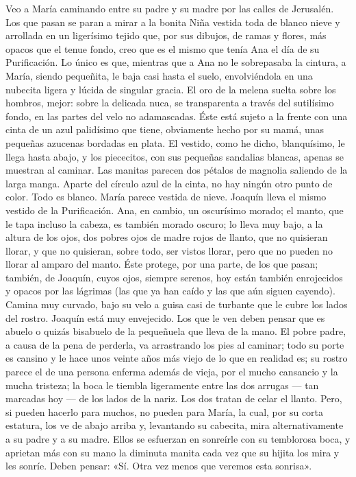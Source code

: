 \documentclass[12pt]{book} %
\begin{document}
Veo a María caminando entre su padre y su madre por las calles de Jerusalén. 
Los que pasan se paran a mirar a la bonita Niña vestida toda de blanco nieve y arrollada en un ligerísimo tejido que, por 
sus dibujos, de ramas y flores, más opacos que el tenue fondo, creo que es el mismo que tenía Ana el día de su Purificación. Lo único es que, mientras que a Ana no le sobrepasaba la cintura, a María, siendo pequeñita, le baja casi hasta el suelo, envolviéndola en una nubecita ligera y lúcida de singular gracia. 
El oro de la melena suelta sobre los hombros, mejor: sobre la delicada nuca, se transparenta a través del sutilísimo fondo, en las partes del velo no adamascadas. Éste está sujeto a la frente con una cinta de un azul palidísimo que tiene, obviamente hecho por su mamá, unas pequeñas azucenas bordadas en plata. 
El vestido, como he dicho, blanquísimo, le llega hasta abajo, y los piececitos, con sus pequeñas sandalias blancas, 
apenas se muestran al caminar. Las manitas parecen dos pétalos de magnolia saliendo de la larga manga. Aparte del círculo azul de la cinta, no hay ningún otro punto de color. Todo es blanco. María parece vestida de nieve. 
Joaquín lleva el mismo vestido de la Purificación. Ana, en cambio, un oscurísimo morado; el manto, que le tapa incluso la cabeza, es también morado oscuro; lo lleva muy bajo, a la altura de los ojos, dos pobres ojos de madre rojos de llanto, que no quisieran llorar, y que no quisieran, sobre todo, ser vistos llorar, pero que no pueden no llorar al amparo del manto. Éste protege, por una parte, de los que pasan; también, de Joaquín, cuyos ojos, siempre serenos, hoy están también enrojecidos y opacos por las lágrimas (las que ya han caído y las que aún siguen cayendo). Camina muy curvado, bajo su velo a guisa casi de turbante que le cubre los lados del rostro. 
Joaquín está muy envejecido. Los que le ven deben pensar que es abuelo o quizás bisabuelo de la pequeñuela que lleva 
de la mano. El pobre padre, a causa de la pena de perderla, va arrastrando los pies al caminar; todo su porte es cansino y le hace unos veinte años más viejo de lo que en realidad es; su rostro parece el de una persona enferma además de vieja, por el mucho cansancio y la mucha tristeza; la boca le tiembla ligeramente entre las dos arrugas — tan marcadas hoy — de los lados de la nariz. 
Los dos tratan de celar el llanto. Pero, si pueden hacerlo para muchos, no pueden para María, la cual, por su corta 
estatura, los ve de abajo arriba y, levantando su cabecita, mira alternativamente a su padre y a su madre. Ellos se esfuerzan en sonreírle con su temblorosa boca, y aprietan más con su mano la diminuta manita cada vez que su hijita los mira y les sonríe. Deben pensar: «Sí. Otra vez menos que veremos esta sonrisa». 
\end{document}
